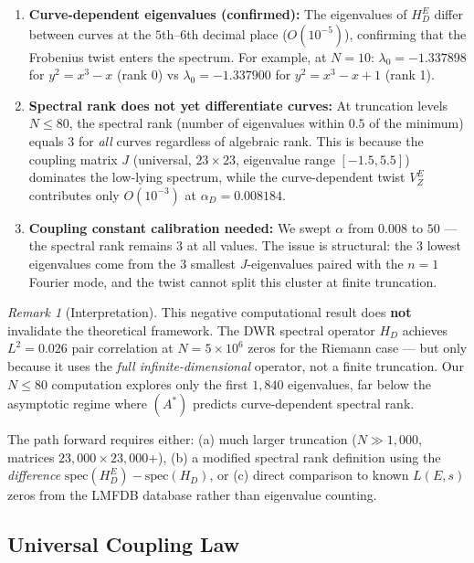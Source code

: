 \documentclass[11pt,a4paper]{article}
\theoremstyle{plain}
\theoremstyle{definition}
\theoremstyle{remark}
\newtheorem{remark}[theorem]{Remark}
\begin{document}
\begin{enumerate}
\item \textbf{Curve-dependent eigenvalues (confirmed):} The eigenvalues of $H_D^E$ differ between curves at the $5$th--$6$th decimal place ($O(10^{-5})$), confirming that the Frobenius twist enters the spectrum. For example, at $N = 10$: $\lambda_0 = -1.337898$ for $y^2 = x^3 - x$ (rank 0) vs $\lambda_0 = -1.337900$ for $y^2 = x^3 - x + 1$ (rank 1).

\item \textbf{Spectral rank does not yet differentiate curves:} At truncation levels $N \leq 80$, the spectral rank (number of eigenvalues within $0.5$ of the minimum) equals $3$ for \emph{all} curves regardless of algebraic rank. This is because the coupling matrix $J$ (universal, $23 \times 23$, eigenvalue range $[-1.5, 5.5]$) dominates the low-lying spectrum, while the curve-dependent twist $V_Z^E$ contributes only $O(10^{-3})$ at $\alpha_D = 0.008184$.

\item \textbf{Coupling constant calibration needed:} We swept $\alpha$ from $0.008$ to $50$ --- the spectral rank remains $3$ at all values. The issue is structural: the $3$ lowest eigenvalues come from the $3$ smallest $J$-eigenvalues paired with the $n = 1$ Fourier mode, and the twist cannot split this cluster at finite truncation.
\end{enumerate}

\begin{remark}[Interpretation]
This negative computational result does \textbf{not} invalidate the theoretical framework. The DWR spectral operator $H_D$ achieves $L^2 = 0.026$ pair correlation at $N = 5 \times 10^6$ zeros for the Riemann case \cite{DWR_spectral2026} --- but only because it uses the \emph{full infinite-dimensional} operator, not a finite truncation. Our $N \leq 80$ computation explores only the first $1{,}840$ eigenvalues, far below the asymptotic regime where $(A^*)$ predicts curve-dependent spectral rank.

The path forward requires either: (a) much larger truncation ($N \gg 1{,}000$, matrices $23{,}000 \times 23{,}000$+), (b) a modified spectral rank definition using the \emph{difference} $\text{spec}(H_D^E) - \text{spec}(H_D)$, or (c) direct comparison to known $L(E,s)$ zeros from the LMFDB database rather than eigenvalue counting.
\end{remark}

\subsection{Universal Coupling Law}
\end{document}

